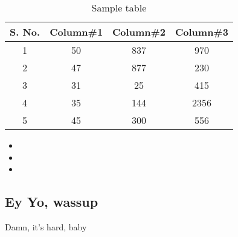 \documentclass[a4paper,11pt]{book}
\begin{document}
\section{}
\begin{table}[ht]
\caption{Sample table} %
\centering %
\begin{tabular}{c c c c}
\hline\hline %
S. No. & Column\#1 & Column\#2 & Column\#3 \\ [0.5ex]
\hline %
1 & 50 & 837 & 970 \\
2 & 47 & 877 & 230 \\
3 & 31 & 25 & 415 \\
4 & 35 & 144 & 2356 \\
5 & 45 & 300 & 556 \\ [1ex] %
\hline %
\end{tabular}
\label{table:nonlin} %
\end{table}
\begin{itemize}
\item 
\item 
\item
\end{itemize}

\subsection{Ey Yo, wassup}
Damn, it's hard, baby
\subsection{}
\end{document}
